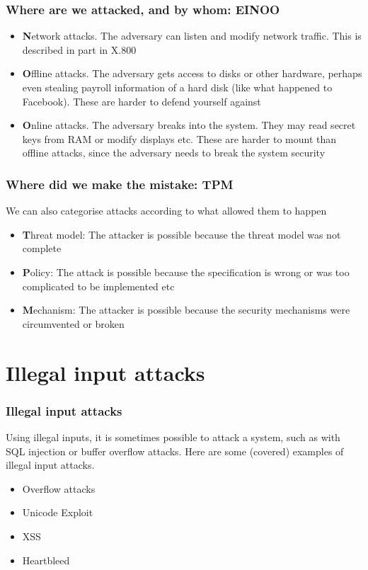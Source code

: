     \begin{frame}
        \frametitle{Where are we attacked, and by whom: EINOO}
            \begin{itemize}
                \item \textbf{N}etwork attacks. The adversary can listen and modify network traffic. This is described in part in X.800
                \item \textbf{O}ffline attacks. The adversary gets access to disks or other hardware, perhaps even stealing payroll information of a hard disk (like what happened to Facebook). These are harder to defend yourself against
                \item \textbf{O}nline attacks. The adversary breaks into the system. They may read secret keys from RAM or modify displays etc. These are harder to mount than offline attacks, since the adversary needs to break the system security
            \end{itemize}
    \end{frame}
    \begin{frame}
        \frametitle{Where did we make the mistake: TPM}
            We can also categorise attacks according to what allowed them to happen
            \begin{itemize}
                \item \textbf{T}hreat model: The attacker is possible because the threat model was not complete
                \item \textbf{P}olicy: The attack is possible because the specification is wrong or was too complicated to be implemented etc
                \item \textbf{M}echanism: The attacker is possible because the security mechanisms were circumvented or broken
            \end{itemize}
    \end{frame}

\section{Illegal input attacks}
    \begin{frame}
        \frametitle{Illegal input attacks} 
            Using illegal inputs, it is sometimes possible to attack a system, such as with SQL injection or buffer overflow attacks. Here are some (covered) examples of illegal input attacks. 
            \begin{itemize}
                \item Overflow attacks
                \item Unicode Exploit
                \item XSS
                \item Heartbleed
            \end{itemize}
    \end{frame}

